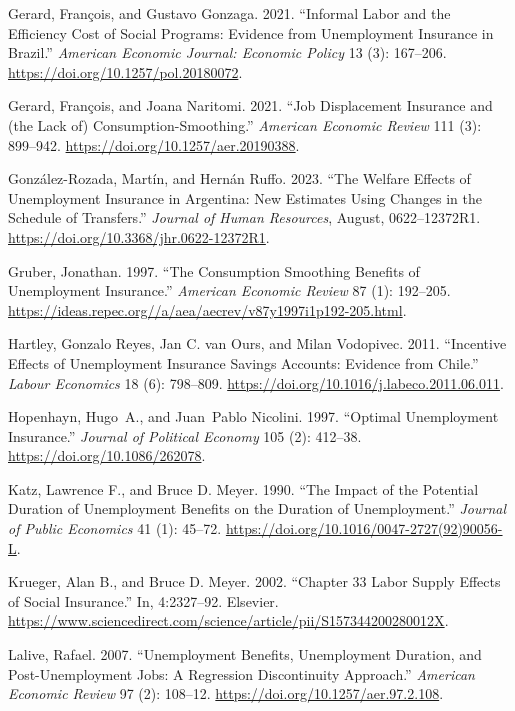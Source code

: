 \documentclass[
  4pt,
]{report}
\newlength{\cslhangindent}
\newenvironment{CSLReferences}[2] %
 {\begin{list}{}{%
  \setlength{\itemindent}{0pt}
  \setlength{\leftmargin}{0pt}
  \setlength{\parsep}{0pt}
  \ifodd #1
   \setlength{\leftmargin}{\cslhangindent}
   \setlength{\itemindent}{-1\cslhangindent}
  \fi
  \setlength{\itemsep}{#2\baselineskip}}}
 {\end{list}}
\begin{document}
\begin{CSLReferences}{1}{0}
Gerard, François, and Gustavo Gonzaga. 2021. {``Informal Labor and the
Efficiency Cost of Social Programs: Evidence from Unemployment Insurance
in Brazil.''} \emph{American Economic Journal: Economic Policy} 13 (3):
167--206. \url{https://doi.org/10.1257/pol.20180072}.

Gerard, François, and Joana Naritomi. 2021. {``Job Displacement
Insurance and (the Lack of) Consumption-Smoothing.''} \emph{American
Economic Review} 111 (3): 899--942.
\url{https://doi.org/10.1257/aer.20190388}.

González-Rozada, Martín, and Hernán Ruffo. 2023. {``The Welfare Effects
of Unemployment Insurance in Argentina: New Estimates Using Changes in
the Schedule of Transfers.''} \emph{Journal of Human Resources}, August,
0622--12372R1. \url{https://doi.org/10.3368/jhr.0622-12372R1}.

Gruber, Jonathan. 1997. {``The Consumption Smoothing Benefits of
Unemployment Insurance.''} \emph{American Economic Review} 87 (1):
192--205.
\url{https://ideas.repec.org//a/aea/aecrev/v87y1997i1p192-205.html}.

Hartley, Gonzalo Reyes, Jan C. van Ours, and Milan Vodopivec. 2011.
{``Incentive Effects of Unemployment Insurance Savings Accounts:
Evidence from Chile.''} \emph{Labour Economics} 18 (6): 798--809.
\url{https://doi.org/10.1016/j.labeco.2011.06.011}.

Hopenhayn, Hugo~A., and Juan~Pablo Nicolini. 1997. {``Optimal
Unemployment Insurance.''} \emph{Journal of Political Economy} 105 (2):
412--38. \url{https://doi.org/10.1086/262078}.

Katz, Lawrence F., and Bruce D. Meyer. 1990. {``The Impact of the
Potential Duration of Unemployment Benefits on the Duration of
Unemployment.''} \emph{Journal of Public Economics} 41 (1): 45--72.
\url{https://doi.org/10.1016/0047-2727(92)90056-L}.

Krueger, Alan B., and Bruce D. Meyer. 2002. {``Chapter 33 Labor Supply
Effects of Social Insurance.''} In, 4:2327--92. Elsevier.
\url{https://www.sciencedirect.com/science/article/pii/S157344200280012X}.

Lalive, Rafael. 2007. {``Unemployment Benefits, Unemployment Duration,
and Post-Unemployment Jobs: A Regression Discontinuity Approach.''}
\emph{American Economic Review} 97 (2): 108--12.
\url{https://doi.org/10.1257/aer.97.2.108}.


\end{CSLReferences}
\end{document}
